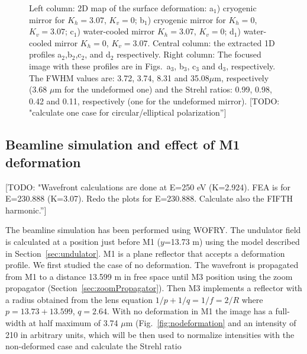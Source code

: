 \documentclass{iucr}              %
\newcommand{\todo}[1]{{\color{red}[TODO: "#1'']}}
\begin{document}
\begin{figure}
\begin{center}
\begin{tabular}{l}
   \end{tabular}
  \end{center}
   \caption
   { \label{fig:M1deformation} 
   Left column: 2D map of the surface deformation: a$_1$) cryogenic mirror for $K_h=3.07$, $K_v=0$; b$_1$) cryogenic mirror for $K_h=0$, $K_v=3.07$; c$_1$) water-cooled mirror $K_h=3.07$, $K_v=0$; d$_1$) water-cooled mirror $K_h=0$, $K_v=3.07$. Central column: the extracted 1D profiles a$_2$,b$_2$,c$_2$, and d$_2$ respectively. Right column: The focused image with these profiles are in Figs.~a$_3$, b$_3$, c$_3$ and d$_3$, respectively. 
   The FWHM values are: 3.72, 3.74, 8.31 and 35.08$\mu$m, respectively (3.68 $\mu$m for the undeformed one) and the Strehl ratios: 0.99, 0.98, 0.42 and 0.11, respectively (one for the undeformed mirror).
   \todo{calculate one case for circular/elliptical polarization}
   }
   \end{figure} 


\subsection{Beamline simulation and effect of M1 deformation}

\todo{Wavefront calculations are done at E=250 eV (K=2.924). FEA is for E=230.888 (K=3.07). Redo the plots for E=230.888. Calculate also the FIFTH harmonic.} 

The beamline simulation has been performed using WOFRY. The undulator field is calculated at a position just before M1 ($y$=13.73 m) using the model described in Section~\ref{sec:undulator}. M1 is a plane reflector that accepts a deformation profile. We first studied the case of no deformation. The wavefront is propagated from M1 to a distance 13.599 m in free space until M3 position using the zoom propagator (Section~\ref{sec:zoomPropagator}). Then M3 implements a reflector with a radius obtained from the lens equation $1/p + 1/q=1/f=2/R$ where $p=13.73+13.599$, $q=2.64$. With no deformation in M1 the image has a full-width at half maximum of 3.74 $\mu$m (Fig.~\ref{fig:nodeformation} and an intensity of 210 in arbitrary units, which will be then used to normalize intensities with the non-deformed case and calculate the Strehl ratio
\end{document}
